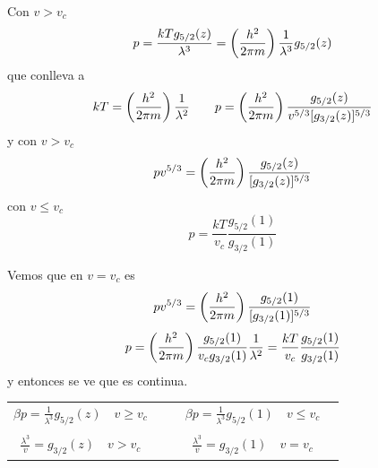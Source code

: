 \documentclass[10pt,oneside]{CBFT_book}
\begin{document}
Con $v > v_c$ 
\[
	p = \frac{ k T g_{5/2}(z) }{\lambda^3} = \left( \frac{ h^2 }{  2\pi m  } \right) \frac{1}{\lambda^3} g_{5/2}(z)
\]
que conlleva a 
\[
	kT = \left( \frac{ h^2 }{  2\pi m  } \right) \frac{1}{\lambda^2} \qquad 
	p =  \left( \frac{ h^2 }{  2\pi m  } \right) \frac{ g_{5/2}(z) }{ v^{5/3} [ g_{3/2}(z) ]^{5/3} }
\]
y con $v > v_c$ 
\[
	pv^{5/3} = \left( \frac{ h^2 }{  2\pi m  } \right) \frac{ g_{5/2}(z) }{ [ g_{3/2}(z) ]^{5/3} }
\]
con $v \leq v_c$ 
\[
	p = \frac{ k T }{ v_c } \frac{ g_{5/2}(1) }{ g_{3/2}(1) }
\]

Vemos que en $ v = v_c $ es
\[
	pv^{5/3} = \left( \frac{ h^2 }{  2\pi m  } \right) \frac{ g_{5/2}(1) }{ [ g_{3/2}(1) ]^{5/3} }
\]
\[
	p = \left( \frac{ h^2 }{  2\pi m  } \right) \frac{ g_{5/2}(1) }{ v_c g_{3/2}(1) }\frac{1}{\lambda^2} =
	\frac{kT}{v_c}\frac{ g_{5/2}(1) }{ g_{3/2}(1) }
\]
y entonces se ve que es continua.

\begin{center}
\begin{tabular}{c|c}
 $\displaystyle \beta p = \frac{1}{\lambda^3} g_{5/2}(z) \quad v \geq v_c \quad $ & 
 $\displaystyle \quad \beta p = \frac{1}{\lambda^3} g_{5/2}(1) \quad v \leq v_c \quad $\\
 & \\
 $\displaystyle \frac{\lambda^3}{v} = g_{3/2}(z) \quad v > v_c \quad $ 
 & $\displaystyle \quad \frac{\lambda^3}{v} = g_{3/2}(1) \quad v = v_c \quad $
\end{tabular}
\end{center}
\end{document}
